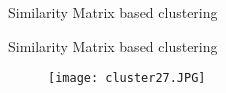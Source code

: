 \begin{frame}{Similarity Matrix based clustering}


\end{frame}

\begin{frame}{Similarity Matrix based clustering}
\begin{figure}
\texttt{[image: cluster27.JPG]}
\end{figure}
\end{frame}

